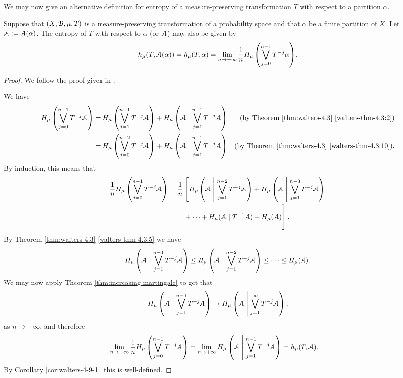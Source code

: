 We may now give an alternative definition for entropy of a measure-preserving transformation $T$ with respect to a partition $\alpha$.

\begin{theorem}
	Suppose that $(X, \mathcal{B}, \mu, T)$ is a measure-preserving transformation of a probability space and that $\alpha$ be a finite partition of $X$. Let $\mathcal{A} := \mathcal{A}(\alpha)$. The entropy of $T$ with respect to $\alpha$ (or $\mathcal{A}$) may also be given by
	\[
		h_\mu(T, \mathcal{A}(\alpha)) = h_\mu(T, \alpha) = \lim_{n \to +\infty}{\frac{1}{n} H_\mu\left(\bigvee_{j = 0}^{n - 1}{}T^{-j}{\alpha}\right)}.
	\]
	\begin{proof}
		We follow the proof given in \cite[Lecture 24]{ergodic-lectures}.
		
		We have
		\begin{align*}
			H_\mu\left(\bigvee_{j = 0}^{n - 1}{T^{-j}{\mathcal{A}}}\right) &= H_\mu\left(\bigvee_{j = 1}^{n - 1}{T^{-j}{\mathcal{A}}}\right) + H_\mu\left(\mathcal{A} \mathrel{}\middle|\mathrel{} \bigvee_{j = 1}^{n - 1}{T^{-j}{\mathcal{A}}}\right) & \text{(by Theorem \ref{thm:walters-4.3} \ref{walters-thm-4.3:2})} \\
				&= H_\mu\left(\bigvee_{j = 0}^{n - 2}{T^{-j}{\mathcal{A}}}\right) + H_\mu\left(\mathcal{A} \mathrel{}\middle|\mathrel{} \bigvee_{j = 1}^{n - 1}{T^{-j}{\mathcal{A}}}\right) & \text{(by Theorem \ref{thm:walters-4.3} \ref{walters-thm-4.3:10})}.
		\end{align*}
		By induction, this means that
		\begin{align*}
			\frac{1}{n} H_\mu\left(\bigjoin_{j = 0}^{n - 1}{T^{-j}{\A}}\right) &= \frac{1}{n}\left[H_\mu\left(\A \midmid \bigjoin_{j = 1}^{n - 2}{T^{-j}{\A}}\right) + H_\mu\left(\A \midmid \bigjoin_{j = 1}^{n - 3}{T^{-j}{\A}}\right)\right. \\
				& \left. \vphantom{\bigjoin_{j = 1}^{n - 2}{T^{-j}{\A}}} \qquad + \dots + H_\mu(\A \mid T^{-1}{\A}) + H_\mu(\A)\right].
		\end{align*}
		By Theorem \ref{thm:walters-4.3} \ref{walters-thm-4.3:5} we have
		\[
			H_\mu\left(\mathcal{A} \mathrel{}\middle|\mathrel{} \bigvee_{j = 1}^{n - 1}{T^{-j}{\mathcal{A}}}\right) \leq H_\mu\left(\mathcal{A} \mathrel{}\middle|\mathrel{} \bigvee_{j = 1}^{n - 2}{T^{-j}{\mathcal{A}}}\right) \leq \dots \leq H_\mu(\mathcal{A}).
		\]
		We may now apply Theorem \ref{thm:increasing-martingale} to get that
		\[
			H_\mu\left(\mathcal{A} \mathrel{}\middle|\mathrel{} \bigvee_{j = 1}^{n - 1}{T^{-j}{\mathcal{A}}}\right) \to H_\mu\left(\mathcal{A} \mathrel{}\middle|\mathrel{} \bigvee_{j = 1}^\infty{T^{-j}{\mathcal{A}}}\right),
		\]
		as $n \to +\infty$, and therefore
		\begin{align*}
			\lim_{n \to +\infty}{\frac{1}{n} H_\mu\left(\bigvee_{j = 0}^{n - 1}{}T^{-j}{\mathcal{A}}\right)} &= \lim_{n \to +\infty}{H_\mu\left(\mathcal{A} \mathrel{}\middle|\mathrel{} \bigvee_{j = 1}^{n - 1}{T^{-j}{\mathcal{A}}}\right)} = h_\mu(T, \mathcal{A}).
		\end{align*}
		By Corollary \ref{cor:walters-4-9-1}, this is well-defined.
	\end{proof}
\end{theorem}

